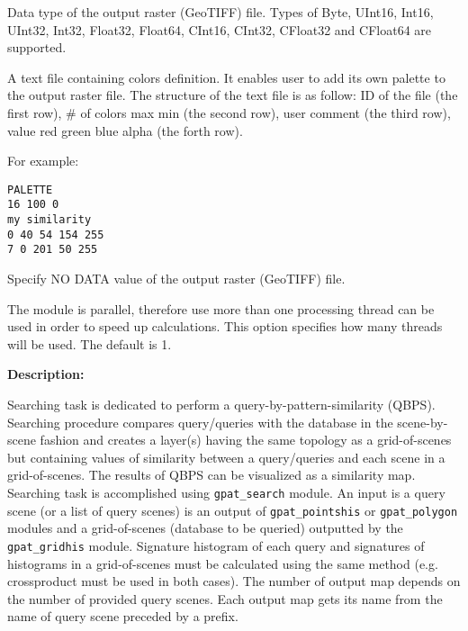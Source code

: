 
Data type of the output raster (GeoTIFF) file. Types of Byte, UInt16, Int16, UInt32, Int32, Float32, Float64, CInt16, CInt32, CFloat32 and CFloat64 are supported.


A text file containing colors definition. 
It enables user to add its own palette to the output raster file.
The structure of the text file is as follow:
ID of the file (the first row), \# of colors max min (the second row), user comment (the third row), value red green blue alpha (the forth row). 

For example: \\
\begin{minipage}{\linewidth}
\begin{lstlisting}
PALETTE
16 100 0
my similarity
0 40 54 154 255
7 0 201 50 255
\end{lstlisting}
\end{minipage}


Specify NO DATA value of the output raster (GeoTIFF) file.


The module is parallel, therefore use more than one processing thread can be used in order to speed up calculations. 
This option specifies how many threads will be used. 
The default is 1.

{\bf Description:}

Searching task is dedicated to perform a query-by-pattern-similarity (QBPS). 
Searching procedure compares query/queries with the database in the scene-by-scene fashion and creates a layer(s) having the same topology as a grid-of-scenes but containing values of similarity between a query/queries and each scene in a grid-of-scenes.
The results of QBPS can be visualized as a similarity map.
Searching task is accomplished using {\tt gpat\_search} module. 
An input is a query scene (or a list of query scenes) is an output of {\tt gpat\_pointshis} or {\tt gpat\_polygon} modules and a grid-of-scenes (database to be queried) outputted by the {\tt gpat\_gridhis} module. 
Signature histogram of each query and signatures of histograms in a grid-of-scenes must be calculated using the same method (e.g. crossproduct must be used in both cases). 
The number of output map depends on the number of provided query scenes.
Each output map gets its name from the name of query scene preceded by a prefix.

